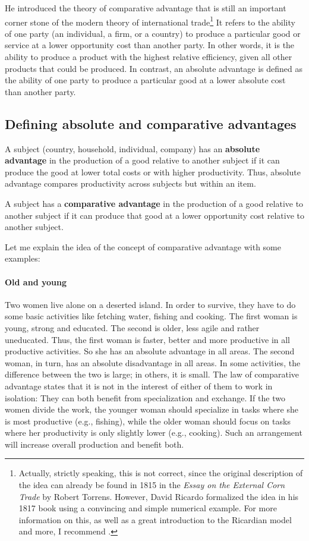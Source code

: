 {\begin{minipage}{0.6\linewidth}
		He introduced the theory of comparative advantage that is still an important corner stone of the modern theory of international trade\footnote{Actually, strictly speaking, this is not correct, since the original description of the idea can already be found in 1815 in the \textit{Essay on the External Corn Trade} by Robert Torrens. However, David Ricardo formalized the idea in his 1817 book using a convincing and simple numerical example. For more information on this, as well as a great introduction to the Ricardian model and more, I recommend \cite{Academy2012International}.} It refers to the ability of one party (an individual, a firm, or a country) to produce a particular good or service at a lower opportunity cost than another party. In other words, it is the ability to produce a product with the highest relative efficiency, given all other products that could be produced. In contrast, an absolute advantage is defined as the ability of one party to produce a particular good at a lower absolute cost than another party.
	\end{minipage}
	
\subsection{Defining absolute and comparative advantages}

A subject (country, household, individual, company) has an \textbf{absolute advantage} in the production of a good relative to another subject if it can produce the good at lower total costs or with higher productivity. Thus, absolute advantage compares productivity across subjects but within an item.

A subject has a \textbf{comparative advantage} in the production of a good relative to another subject if it can produce that good at a lower opportunity cost relative to another subject. 

	Let me explain the idea of the concept of comparative advantage with some examples:
	\paragraph{Old and young}
	Two women live alone on a deserted island. In order to survive, they have to do some basic activities like fetching water, fishing and cooking. The first woman is young, strong and educated. The second is older, less agile and rather uneducated. Thus, the first woman is faster, better and more productive in all productive activities. So she has an absolute advantage in all areas. The second woman, in turn, has an absolute disadvantage in all areas. In some activities, the difference between the two is large; in others, it is small.
	The law of comparative advantage states that it is not in the interest of either of them to work in isolation: They can both benefit from specialization and exchange. If the two women divide the work, the younger woman should specialize in tasks where she is most productive (e.g., fishing), while the older woman should focus on tasks where her productivity is only slightly lower (e.g., cooking). Such an arrangement will increase overall production and benefit both.
	
}

